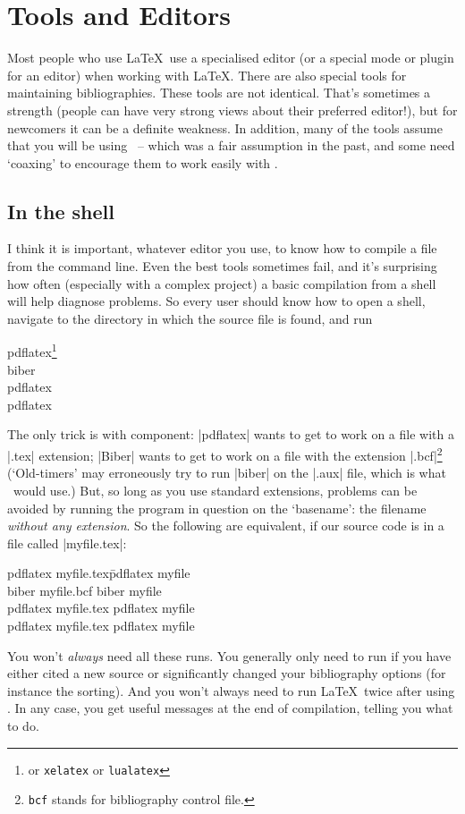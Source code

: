 \chapter{Tools and Editors}\label{chapter:tools}

Most people who use \LaTeX\ use a specialised editor (or a special
mode or plugin for an editor) when working with \LaTeX. There are also
special tools for maintaining bibliographies. These tools are not
identical. That's sometimes a strength (people can have very strong
views about their preferred editor!), but for newcomers it can be a
definite weakness. In addition, many of the tools assume that you will
be using \bibtex\ -- which was a fair assumption in the past, and some
need `coaxing' to encourage them to work easily with \biblatex.

\section{In the shell}

I think it is important, whatever editor you use, to know how to
compile a file from the command line. Even the best tools sometimes
fail, and it's surprising how often (especially with a complex
project) a basic compilation from a shell will help diagnose
problems. So every user should know how to open a shell, navigate to
the directory in which the source file is found, and run
\begin{pseudoverb}
pdflatex\footnote{or \texttt{xelatex} or \texttt{lualatex}} \\
biber \\
pdflatex \\
pdflatex 
\end{pseudoverb}
The only trick is with  component: |pdflatex| wants to
get to work on a file with a |.tex| extension; |Biber| wants to get to
work on a file with the extension |.bcf|\footnote{\texttt{bcf} stands
  for bibliography control file.} (`Old-timers' may erroneously try to
run |biber| on the |.aux| file, which is what \bibtex\ would use.)
But, so long as you use standard extensions, problems can be
avoided by running the program in question on the `basename': the
filename \emph{without any extension}. So the following are
equivalent, if our source code is in a file called |myfile.tex|:
\begin{pseudoverb}
\begin{tabbing}
pdflatex myfile.tex\qquad   \= pdflatex myfile\\
biber myfile.bcf \> biber myfile\\
pdflatex myfile.tex \> pdflatex myfile\\
pdflatex myfile.tex \> pdflatex myfile
\end{tabbing}
\end{pseudoverb}
You won't \emph{always} need all these runs. You generally only need
to run  if you have either cited a new source or
significantly changed your bibliography options (for instance the
sorting). And you won't always need to run \LaTeX\ twice after using
. In any case, you get useful messages at the end of
compilation, telling you what to do.

